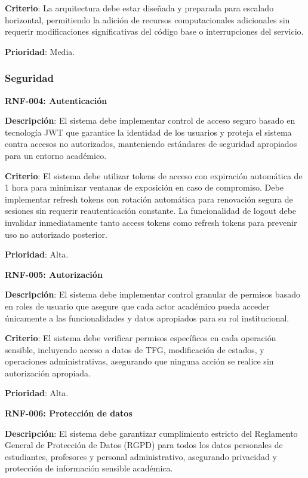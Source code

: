 \documentclass[12pt,a4paper,oneside]{report}
\begin{document}
\textbf{Criterio}: La arquitectura debe estar diseñada y preparada para escalado horizontal, permitiendo la adición de recursos computacionales adicionales sin requerir modificaciones significativas del código base o interrupciones del servicio.

\textbf{Prioridad}: Media.

\subsubsection{Seguridad}\label{seguridad}

\textbf{RNF-004: Autenticación}

\textbf{Descripción}: El sistema debe implementar control de acceso seguro basado en tecnología JWT que garantice la identidad de los usuarios y proteja el sistema contra accesos no autorizados, manteniendo estándares de seguridad apropiados para un entorno académico.

\textbf{Criterio}: El sistema debe utilizar tokens de acceso con expiración automática de 1 hora para minimizar ventanas de exposición en caso de compromiso. Debe implementar refresh tokens con rotación automática para renovación segura de sesiones sin requerir reautenticación constante. La funcionalidad de logout debe invalidar inmediatamente tanto access tokens como refresh tokens para prevenir uso no autorizado posterior.

\textbf{Prioridad}: Alta.

\textbf{RNF-005: Autorización}

\textbf{Descripción}: El sistema debe implementar control granular de permisos basado en roles de usuario que asegure que cada actor académico pueda acceder únicamente a las funcionalidades y datos apropiados para su rol institucional.

\textbf{Criterio}: El sistema debe verificar permisos específicos en cada operación sensible, incluyendo acceso a datos de TFG, modificación de estados, y operaciones administrativas, asegurando que ninguna acción se realice sin autorización apropiada.

\textbf{Prioridad}: Alta.

\textbf{RNF-006: Protección de datos}

\textbf{Descripción}: El sistema debe garantizar cumplimiento estricto del Reglamento General de Protección de Datos (RGPD) para todos los datos personales de estudiantes, profesores y personal administrativo, asegurando privacidad y protección de información sensible académica.
\end{document}
